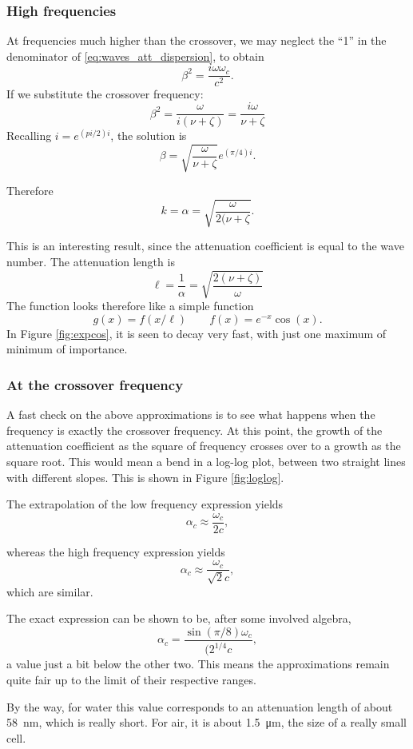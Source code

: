 \subsubsection{High frequencies}

At frequencies much higher than the crossover, we may neglect the
``1'' in the denominator of \ref{eq:waves_att_dispersion}, to obtain
\[
\beta^2 = \frac{i \omega\omega_c}{c^2} .
\]
If we substitute the crossover frequency:
\[
\beta^2 = \frac{\omega}{i(\nu+\zeta)} =\frac{i \omega}{\nu+\zeta} 
\]
Recalling $i = e^{(pi/2)i} $, the solution is
\[
\beta =\sqrt{ \frac{\omega}{ \nu + \zeta }} e^{(\pi/4)i}.
\]

Therefore
\[
k=\alpha =\sqrt{\frac{\omega}{ 2 (\nu+ \zeta}}.
\]

This is an interesting result, since the attenuation coefficient is
equal to the wave number. The attenuation length is
\[
\ell= \frac{1}{\alpha}=\sqrt{\frac{ 2 (\nu+ \zeta)}{\omega}}
\]
The function looks therefore like a simple function
\[
g(x)= f(x/\ell) \qquad  f(x) = e^{-x}\cos(x) .
\]
In Figure \ref{fig:expcos}, it is seen to decay very fast, with just
one maximum of minimum of importance.



\subsubsection{At the crossover frequency}


A fast check on the above approximations is to see what happens when
the frequency is exactly the crossover frequency. At this point, the
growth of the attenuation coefficient as the square of frequency
crosses over to a growth as the square root. This would mean a bend in
a log-log plot, between two straight lines with different slopes. This
is shown in Figure \ref{fig:loglog}.

The extrapolation of the low frequency expression yields
\[
\alpha_c\approx \frac{\omega_c}{2 c} ,
\]

whereas the high frequency expression yields
\[
\alpha_c\approx \frac{\omega_c}{\sqrt{2} c} ,
\]
which are similar.

The exact expression can be shown to be, after some involved algebra,
\[
\alpha_c =\frac{ \sin(\pi/8) \omega_c }{ (2^{1/4} c } ,
\]
a value just a bit below the other two. This means the approximations
remain quite fair up to the limit of their respective ranges.

By the way, for water this value corresponds to an attenuation length
of about \SI{58}{\nano\meter}, which is really short. For air, it is
about \SI{1.5}{\micro\meter}, the size of a really small cell.


